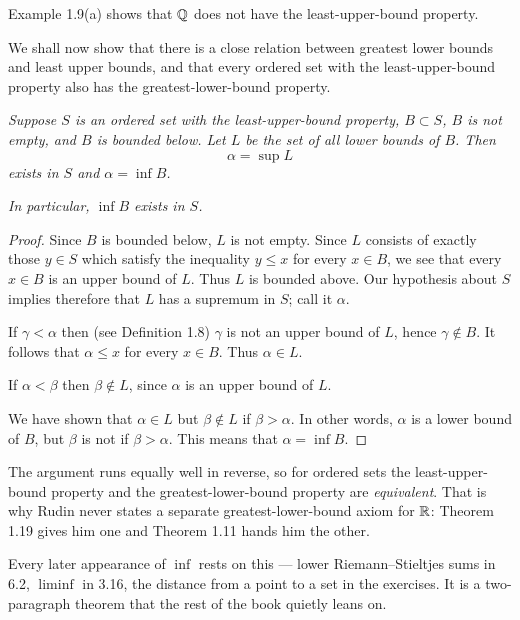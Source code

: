 \documentclass[11pt,twoside]{article}
\begin{document}
Example 1.9(a) shows that $\mathbb{Q}$ does not have the least-upper-bound property.

We shall now show that there is a close relation between greatest lower bounds
and least upper bounds, and that every ordered set with the least-upper-bound
property also has the greatest-lower-bound property.

\emph{Suppose $S$ is an ordered set with the least-upper-bound property,
$B \subset S$, $B$ is not empty, and $B$ is bounded below. Let $L$ be the set of
all lower bounds of $B$. Then}
\[ \alpha = \sup L \]
\emph{exists in $S$ and $\alpha = \inf B$.}

\emph{In particular, $\inf B$ exists in $S$.}

\begin{proof}
Since $B$ is bounded below, $L$ is not empty. Since $L$ consists of exactly
those $y \in S$ which satisfy the inequality $y \le x$ for every $x \in B$, we
see that every $x \in B$ is an upper bound of $L$. Thus $L$ is bounded above. Our hypothesis about $S$ implies therefore
that $L$ has a supremum in $S$; call it $\alpha$.

If $\gamma < \alpha$ then (see Definition 1.8) $\gamma$ is not an upper bound of
$L$, hence $\gamma \notin B$. It follows that
$\alpha \le x$ for every $x \in B$. Thus $\alpha \in L$.

If $\alpha < \beta$ then $\beta \notin L$, since $\alpha$ is an upper bound of
$L$.

We have shown that $\alpha \in L$ but $\beta \notin L$ if $\beta > \alpha$. In
other words, $\alpha$ is a lower bound of $B$, but $\beta$ is not if
$\beta > \alpha$. This means that $\alpha = \inf B$.
\end{proof}

\begin{deeper}
The argument runs equally well in reverse, so for ordered sets the
least-upper-bound property and the greatest-lower-bound property are
\emph{equivalent}. That is why Rudin never states a separate greatest-lower-bound
axiom for $\mathbb{R}$: Theorem 1.19 gives him one and Theorem 1.11 hands him the other.

Every later appearance of $\inf$ rests on this --- lower Riemann--Stieltjes sums
in 6.2, $\liminf$ in 3.16, the distance from a point to a set in the exercises.
It is a two-paragraph theorem that the rest of the book quietly leans on.
\end{deeper}
\end{document}
